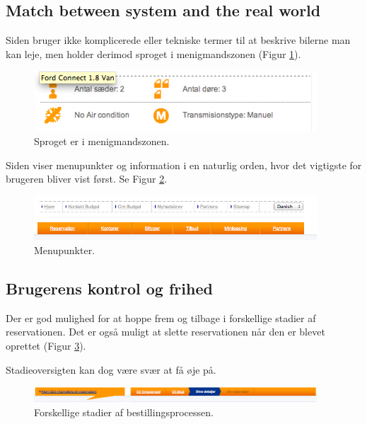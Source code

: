 \documentclass[a4paper]{article}
\begin{document}
\subsection{Match between system and the real world}
Siden bruger ikke komplicerede eller tekniske termer til at beskrive bilerne man
kan leje, men holder derimod sproget i menigmandszonen (Figur \ref{sprog}).

\begin{figure}[]
  \begin{center}
    \includegraphics[width=400px]{5.png}
  \end{center}
  \caption{Sproget er i menigmandszonen.}
  \label{sprog}
\end{figure}

Siden viser menupunkter og information i en naturlig orden, hvor det vigtigste
for brugeren bliver vist først. Se Figur \ref{menu}.

\begin{figure}[]
  \begin{center}
    \includegraphics[width=400px]{2.png}
  \end{center}
  \caption{Menupunkter.}
  \label{menu}
\end{figure}

\subsection{Brugerens kontrol og frihed}
Der er god mulighed for at hoppe frem og tilbage i forskellige stadier af
reservationen. Det er også muligt at slette reservationen når den er blevet
oprettet (Figur \ref{stadier}).

Stadieoversigten kan dog være svær at få øje på.
\begin{figure}[]
  \begin{center}
    \includegraphics[width=400px]{9.png}
  \end{center}
  \caption{Forskellige stadier af bestillingsprocessen.}
  \label{stadier}
\end{figure}
\end{document}
